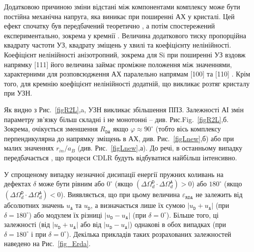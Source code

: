 Додатковою причиною зміни відстані між компонентами комплексу може бути постійна механічна напруга,
яка виникає при поширенні АХ у кристалі.
Цей ефект спочатку був передбачений теоретично \cite{Thurston,StaticStrain:PhysRevB30I}, а потім
спостережений експериментально, зокрема у кремнії \cite{StaticStrain:PhysRevB30II}.
Величина додаткового тиску пропорційна квадрату частоти УЗ, квадрату зміщень у хвилі та коефіцієнту нелінійності\cite{StaticStrain:PhysRevB30II}.
Коефіцієнт нелінійності анізотропний, зокрема для Si при
поширенні УЗ вздовж напрямку [111] його величина займає проміжне положення між значеннями, характерними для розповсюдження АХ
паралельно напрямам [100] та [110] \cite{NelinSi}.
Крім того, для кремнію коефіцієнт нелінійності додатній, що викликає розтяг кристалу при УЗН.




Як видно з Рис.~\ref{figR2L},a, УЗН викликає збільшення ППЗ.
Залежності АІ змін параметру зв'язку більш складні і не монотонні -- див. Рис.Fig.~\ref{figR2L},б.
Зокрема, очікується  зменшення $R_{\mathtt{DA}}$ якщо $\varphi\approx90^\circ$ (тобто вісь комплексу перпендикулярна до напрямку зміщень в АХ, див. Рис.~\ref{figLnew},б)
або при малих значеннях $r_{in}/a_B$ (див. Рис.~\ref{figLnew},а).
До речі, в останньому випадку передбачається \cite{CDLR:JAP1995,CDLR:JAP}, що процеси CDLR будуть відбуватися найбільш інтенсивно.

У спрощеному випадку незначної дисипації енергії пружних коливань на дефектах
$\delta$ може бути рівним або $0^\circ$ (якщо $(\Delta\Omega_d^\mathtt{D}\cdot\Delta\Omega_d^\mathtt{A})>0$)
або $180^\circ$ (якщо $(\Delta\Omega_d^\mathtt{D}\cdot\Delta\Omega_d^\mathtt{A})<0$).
Виявляється, що при цьому величина $\varepsilon_{\mathtt{RDA}}$ не залежить від абсолютних значень $u_\mathtt{A}$ та $u_\mathtt{D}$,
а визначається лише їх сумою $|u_\mathtt{D}+u_\mathtt{A}|$ (при $\delta=180^\circ$)
або модулем їх різниці $|u_\mathtt{D}-u_\mathtt{A}|$ (при $\delta=0^\circ$).
Більше того, ці залежності (від $|u_\mathtt{D}+u_\mathtt{A}|$ або від $|u_\mathtt{D}-u_\mathtt{A}|$) однакові в обох випадках
(при $\delta=180^\circ$ і при $\delta=0^\circ$).
Декілька прикладів таких розрахованих залежностей наведено на Рис.~\ref{fig_Erda}.

